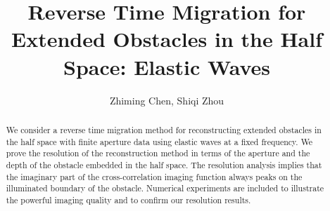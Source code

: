 \documentclass[12pt]{iopart}
\begin{document}

\def\debproof{\noindent {\bf Proof.} }
\def\finproof{\hfill {\small $\Box$} \\}

\makeatletter %
\makeatother  %
\renewcommand\theequation{{\thesection}.{\arabic{equation}}}
\title[]{Reverse Time Migration for Extended Obstacles in the Half Space: Elastic Waves}
\author{ Zhiming Chen, Shiqi Zhou }
\address{LSEC, Institute of Computational Mathematics, Academy of
	Mathematics and Systems Science, Chinese Academy of Sciences,
	Beijing 100190, China}

\begin{abstract}
	We consider a reverse time migration method for reconstructing extended
	obstacles in the half space with finite aperture data using elastic waves at a fixed
	frequency. We prove the resolution of the reconstruction method in terms of the
	aperture and the depth of the obstacle embedded in the half space. The resolution
	analysis implies that the imaginary part of the cross-correlation imaging function
	always peaks on the illuminated boundary of the obstacle. Numerical experiments
	are included to illustrate the powerful imaging quality and to confirm our resolution
	results. 
\end{abstract}
\maketitle
\newcommand{\eps}{\varepsilon}
\newcommand{\RR}{\mathcal{R}}
\newtheorem{lem}{Lemma}[section]
\newtheorem{prop}{Proposition}[section]
\newtheorem{cor}{Corollary}[section]
\newtheorem{thm}{Theorem}[section]
\newtheorem{rem}{Remark}[section]
\newtheorem{alg}{Algorithm}[section]
\newtheorem{assum}{Assumption}[section]
\newtheorem{definition}{Definition}[section]


\newcommand{\MyRoman}[1]{\rm\setcounter{RomanNumber}{#1}\Roman{RomanNumber}}
\end{document}
